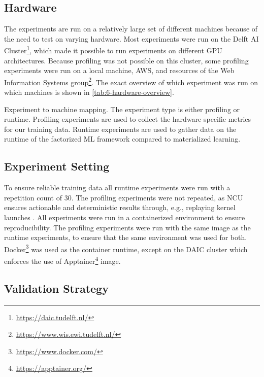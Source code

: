 \subsection{Hardware}
\label{subsec:6-hardware}

The experiments are run on a relatively large set of different machines because of the need to test on varying hardware. Most experiments were run on the Delft AI Cluster\footnote{\url{https://daic.tudelft.nl/}}, which made it possible to run experiments on different GPU architectures. Because profiling was not possible on this cluster, some profiling experiments were run on a local machine, AWS, and resources of the Web Information Systems group\footnote{\url{https://www.wis.ewi.tudelft.nl/}}. The exact overview of which experiment was run on which machines is shown in \autoref{tab:6-hardware-overview}.

\begin{table}[ht]
    \centering
    
    \caption[Experiment to machine mapping]{Experiment to machine mapping. The experiment type is either profiling or runtime. Profiling experiments are used to collect the hardware specific metrics for our training data. Runtime experiments are used to gather data on the runtime of the factorized ML framework compared to materialized learning.}
    \label{tab:6-hardware-overview}
\end{table}

\subsection{Experiment Setting}
To ensure reliable training data all runtime experiments were run with a repetition count of $30$. The profiling experiments were not repeated, as NCU ensures actionable and deterministic results through, e.g., replaying kernel launches \cite{nsight_compute}. All experiments were run in a containerized environment to ensure reproducibility. The profiling experiments were run with the same image as the runtime experiments, to ensure that the same environment was used for both. Docker\footnote{\url{https://www.docker.com/}} was used as the container runtime, except on the DAIC cluster which enforces the use of Apptainer\footnote{\url{https://apptainer.org/}} image.

\subsection{Validation Strategy}
\label{subsec:6-validation-strategy}

